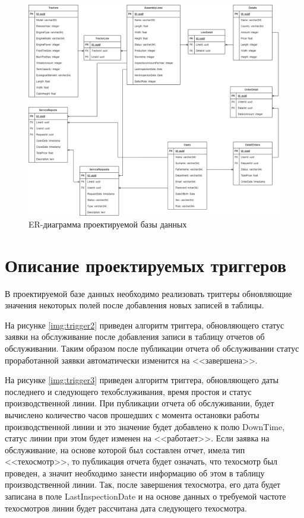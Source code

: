 \begin{figure}[H]
    \centering
    \includegraphics[width=1\textwidth]{inc/img/er.png}
    \caption{ER-диаграмма проектируемой базы данных}
    \label{img:erdb}
\end{figure}

\section{Описание проектируемых триггеров}

В проектируемой базе данных необходимо реализовать триггеры обновляющие значения некоторых полей после добавления новых записей в таблицы. 

На рисунке \ref{img:trigger2} приведен алгоритм триггера, обновляющего статус заявки на обслуживание после добавления записи в таблицу отчетов об обслуживании. Таким образом после публикации отчета об обслуживании статус проработанной заявки автоматически изменится на <<завершена>>.

На рисунке \ref{img:trigger3} приведен алгоритм триггера, обновляющего даты последнего и следующего техобслуживания, время простоя и статус производственной линии. При публикации отчета об обслуживании, будет вычислено количество часов прошедших с момента остановки работы производственной линии и это значение будет добавлено к полю DownTime, статус линии при этом будет изменен на <<работает>>. Если заявка на обслуживание, на основе которой был составлен отчет, имела тип <<техосмотр>>, то публикация отчета будет означать, что техосмотр был проведен, а значит необходимо занести информацию об этом в таблицу производственной линии. Так, после завершения техосмотра, его дата будет записана в поле LastInspectionDate и на основе данных о требуемой частоте техосмотров линии будет рассчитана дата следующего техосмотра.

